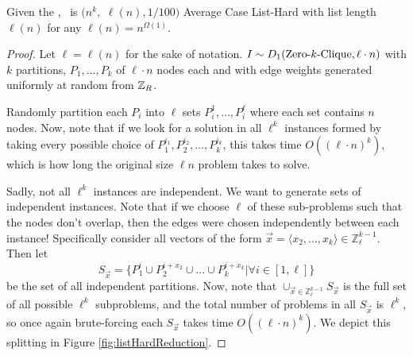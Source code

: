 \begin{theorem}
	Given the \strongzkc, \zkclique~is $(n^k,$ $\ell(n), 1/100)$ Average Case List-Hard with list length $\ell(n)$ for any $\ell(n) = n^{\Omega(1)}$.
	\label{thm:zkcAvgListHard}
\end{theorem}
\begin{proof}
	Let $\ell = \ell(n)$ for the sake of notation. $I \sim D_1(\mbox{Zero-$k$-Clique}, \ell \cdot n)$ with $k$ partitions, $P_1, \ldots, P_k$ of $\ell \cdot n$ nodes each and with edge weights generated uniformly at random from $\mathbb{Z}_R$.
	
	Randomly partition each $P_i$ into $\ell$ sets $P_i^1, \ldots, P_i^\ell$ where each set contains $n$ nodes. Now, note that if we look for a solution in all $\ell^k$ instances formed by taking every possible choice of $P_1^{i_1}, P_2^{i_2},\ldots, P_k^{i_k}$, this takes time $O((\ell\cdot  n)^k)$, which is how long the original size $\ell n$ problem takes to solve. 
	
	Sadly, not all $\ell^k$ instances are independent. We want to generate sets of independent instances. Note that if we choose $\ell$ of these sub-problems such that the nodes don't overlap, then the edges were chosen independently between each instance! Specifically consider all vectors of the form $\vec{x} = \langle x_2, \ldots, x_k\rangle \in \mathbb{Z}_{\ell}^{k-1}$. Then let 
	$$S_{\vec{x}}= \{P_1^i \cup P_2^{i+x_2} \cup \ldots \cup P_k^{i+x_k}|\forall i\in [1,\ell]\}$$
	be the set of all independent partitions. Now, note that $\cup_{\vec{x} \in \mathbb{Z}_\ell^{k-1}} S_{\vec{x}}$ is the full set of all possible $\ell^k$ subproblems, and the total number of problems in all $S_{\vec{x}}$ is $\ell^k$, so once again brute-forcing each $S_{\vec{x}}$ takes time $O((\ell \cdot n)^k)$. We depict this splitting in Figure \ref{fig:listHardReduction}.
	

\end{proof}
